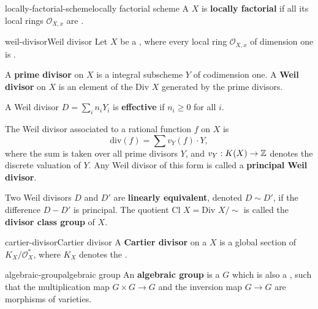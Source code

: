 \begin{topic}{locally-factorial-scheme}{locally factorial scheme}
    A  $X$ is \textbf{locally factorial} if all its local rings $\mathcal{O}_{X,x}$ are .
\end{topic}

\begin{topic}{weil-divisor}{Weil divisor}
    Let $X$ be a    , where every local ring $\mathcal{O}_{X,x}$ of dimension one is .
    
    A \textbf{prime divisor} on $X$ is a  integral subscheme $Y$ of codimension one. A \textbf{Weil divisor} on $X$ is an element of the  $\text{Div } X$ generated by the prime divisors.
    
    A Weil divisor $D = \sum_i n_i Y_i$ is \textbf{effective} if $n_i \ge 0$ for all $i$.
    
    The Weil divisor associated to a rational function $f$ on $X$ is
    \[ \text{div}(f) = \sum v_Y(f) \cdot Y , \]
    where the sum is taken over all prime divisors $Y$, and $v_Y : K(X) \to \mathbb{Z}$ denotes the discrete valuation of $Y$. Any Weil divisor of this form is called a \textbf{principal Weil divisor}.
    
    Two Weil divisors $D$ and $D'$ are \textbf{linearly equivalent}, denoted $D \sim{} D'$, if the difference $D - D'$ is principal. The quotient $\text{Cl } X = \text{Div } X / \sim{}$ is called the \textbf{divisor class group} of $X$.
\end{topic}

\begin{topic}{cartier-divisor}{Cartier divisor}
    A \textbf{Cartier divisor} on a  $X$ is a global section of $K_X / \mathcal{O}_X^*$, where $K_X$ denotes the .
\end{topic}

\begin{topic}{algebraic-group}{algebraic group}
    An \textbf{algebraic group} is a  $G$ which is also a , such that the multiplication map $G \times G \to G$ and the inversion map $G \to G$ are morphisms of varieties.
\end{topic}

